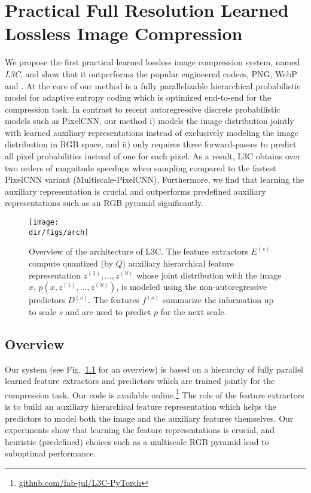 \chapter{Practical Full Resolution Learned Lossless Image Compression}
\label{ch:l3c}

We propose the first practical learned lossless image compression system, named
\emph{L3C}, and show that it outperforms the popular engineered codecs, PNG,
WebP and \jpegk.  At the core of our method is a fully parallelizable
hierarchical probabilistic model for adaptive entropy coding which is optimized
end-to-end for the compression task.  In contrast to recent autoregressive
discrete probabilistic models such as PixelCNN, our method i) models the image
distribution jointly with learned auxiliary representations instead of
exclusively modeling the image distribution in RGB space, and ii) only requires
three forward-passes to predict all pixel probabilities instead of one for each
pixel.  As a result, L3C obtains over two orders of magnitude speedups when
sampling compared to the fastest PixelCNN variant (Multiscale-PixelCNN).
Furthermore, we find that learning the auxiliary representation is crucial and
outperforms predefined auxiliary representations such as an RGB pyramid
significantly.

\begin{figure}
\centering
\texttt{[image: \\dir/figs/arch]}
    \caption{\label{l3c:fig:arch}Overview of the architecture of L3C. The feature extractors $E^{(s)}$ compute quantized (by $Q$) auxiliary hierarchical feature representation $z^{(1)}, \ldots, z^{(S)}$ whose joint distribution with the image $x$, $p(x,z^{(1)}, \ldots, z^{(S)})$, is modeled using the non-autoregressive predictors $D^{(s)}$. The features $f^{(s)}$ summarize the information up to scale $s$ and are used to predict $p$ for the next scale.}
\end{figure}

\section{Overview}

Our system (see Fig.~\ref{l3c:fig:arch} for an overview) is based on a hierarchy of fully parallel learned feature extractors and predictors which are trained jointly for the compression task. Our code is available online.\footnote{\label{l3c:fn:github}\url{github.com/fab-jul/L3C-PyTorch}} The role of the feature extractors is to build an auxiliary hierarchical feature representation which helps the predictors to model both the image and the auxiliary features themselves. Our experiments show that learning the feature representations is crucial, and heuristic (predefined) choices such as a multiscale RGB pyramid lead to suboptimal performance.

